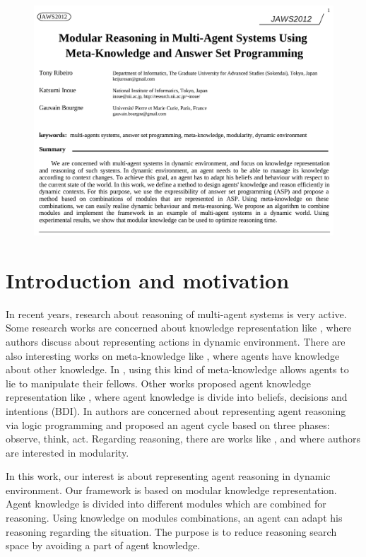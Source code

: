\documentclass{aamas2012}
\begin{document}
	\begin{figure}
		\includegraphics{page1.pdf}
	\end{figure}
	
	\clearpage

\section{Introduction and motivation}

	In recent years, research about reasoning of multi-agent systems is very active.
	Some research works are concerned about knowledge representation like \cite{DBLP:conf/birthday/BaralG11},
	where authors discuss about representing actions in dynamic environment.
	There are also interesting works on meta-knowledge like \cite{DBLP:conf/atal/BaralGSP10}, 
	where agents have knowledge about other knowledge.
	In \cite{DBLP:conf/ijcai/SakamaSP11}, using this kind of meta-knowledge allows agents to lie to manipulate their fellows.
	Other works proposed agent knowledge representation like \cite{DBLP:conf/icmas/RaoG95}, 
	where agent knowledge is divide into beliefs, decisions and intentions (BDI).
	In \cite{DBLP:journals/amai/KowalskiS99} authors are concerned about representing agent reasoning via logic programming 
	and proposed an agent cycle based on three phases: observe, think, act.
	Regarding reasoning, there are works like \cite{DBLP:conf/datalog/Costantini10}, \cite{DBLP:conf/lpnmr/Costantini09}
	and \cite{DBLP:conf/aaaiss/BaralAD06} where authors are interested in modularity.
	
	In this work, our interest is about representing agent reasoning in dynamic environment.
	Our framework is based on modular knowledge representation.
	Agent knowledge is divided into different modules which are combined for reasoning.
	Using knowledge on modules combinations, an agent can adapt his reasoning regarding the situation.
	The purpose is to reduce reasoning search space by avoiding a part of agent knowledge.
	
\end{document}
